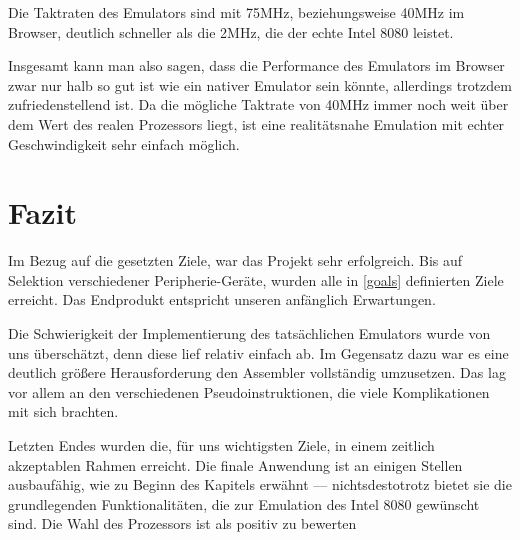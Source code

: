 Die Taktraten des Emulators sind mit 75MHz, beziehungsweise 40MHz im Browser, deutlich schneller als die 2MHz, die der echte Intel 8080 leistet.

Insgesamt kann man also sagen, dass die Performance des Emulators im Browser zwar nur halb so gut ist wie ein nativer Emulator sein könnte, allerdings trotzdem zufriedenstellend ist. Da die mögliche Taktrate von 40MHz immer noch weit über dem Wert des realen Prozessors liegt, ist eine realitätsnahe Emulation mit echter Geschwindigkeit sehr einfach möglich.

\section{Fazit}

Im Bezug auf die gesetzten Ziele, war das Projekt sehr erfolgreich. Bis auf Selektion verschiedener Peripherie-Geräte, wurden alle in \cref{goals} definierten Ziele erreicht. Das Endprodukt entspricht unseren anfänglich Erwartungen.

Die Schwierigkeit der Implementierung des tatsächlichen Emulators wurde von uns überschätzt, denn diese lief relativ einfach ab. Im Gegensatz dazu war es eine deutlich größere Herausforderung den Assembler vollständig umzusetzen. Das lag vor allem an den verschiedenen Pseudoinstruktionen, die viele Komplikationen mit sich brachten.

Letzten Endes wurden die, für uns wichtigsten Ziele, in einem zeitlich akzeptablen Rahmen erreicht. Die finale Anwendung ist an einigen Stellen ausbaufähig, wie zu Beginn des Kapitels erwähnt --- nichtsdestotrotz bietet sie die grundlegenden Funktionalitäten, die zur Emulation des Intel 8080 gewünscht sind. Die Wahl des Prozessors ist als positiv zu bewerten
